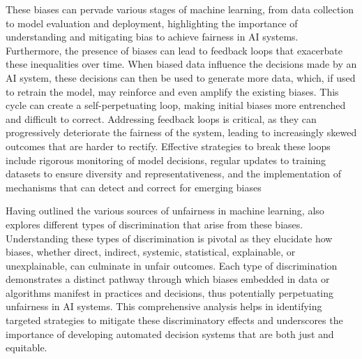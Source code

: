 These biases can pervade various stages of machine learning, from data collection to model evaluation and deployment, highlighting the importance of understanding and mitigating bias to achieve fairness in AI systems. Furthermore, the presence of biases can lead to feedback loops that exacerbate these inequalities over time. When biased data influence the decisions made by an AI system, these decisions can then be used to generate more data, which, if used to retrain the model, may reinforce and even amplify the existing biases. This cycle can create a self-perpetuating loop, making initial biases more entrenched and difficult to correct. Addressing feedback loops is critical, as they can progressively deteriorate the fairness of the system, leading to increasingly skewed outcomes that are harder to rectify. Effective strategies to break these loops include rigorous monitoring of model decisions, regular updates to training datasets to ensure diversity and representativeness, and the implementation of mechanisms that can detect and correct for emerging biases

Having outlined the various sources of unfairness in machine learning, \citet{Mehrabi2019} also explores different types of discrimination that arise from these biases. Understanding these types of discrimination is pivotal as they elucidate how biases, whether direct, indirect, systemic, statistical, explainable, or unexplainable, can culminate in unfair outcomes. Each type of discrimination demonstrates a distinct pathway through which biases embedded in data or algorithms manifest in practices and decisions, thus potentially perpetuating unfairness in AI systems. This comprehensive analysis helps in identifying targeted strategies to mitigate these discriminatory effects and underscores the importance of developing automated decision systems that are both just and equitable.


